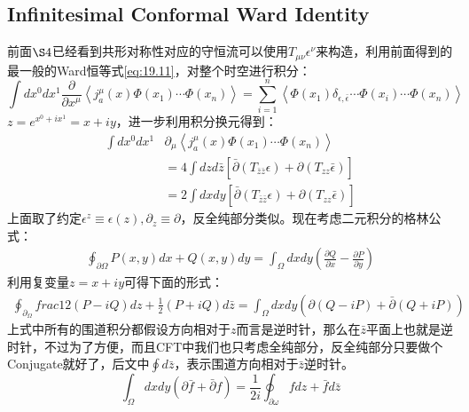 \subsection{Infinitesimal Conformal Ward Identity}
前面$\S 4$已经看到共形对称性对应的守恒流可以使用$T_{\mu\nu}\epsilon^\nu$来构造，利用前面得到的最一般的Ward恒等式\ref{eq:19.11}，对整个时空进行积分：
\begin{equation}
	\int dx^0dx^1\frac\partial{\partial x^{\mu}} \left\langle j_{a}^{\mu}(x)\Phi(x_{1})\cdots\Phi(x_{n})\right\rangle  =\sum_{i=1}^{n}\left<\Phi(x_{1})\delta_{\epsilon,\bar \epsilon}\cdots\Phi(x_{i})\cdots\Phi(x_{n})\right>
\end{equation}
$z=e^{x^0+ix^1}=x+iy$，进一步利用积分换元得到：
\begin{equation}
	\begin{aligned}
		\int dx^0dx^1&\partial_\mu\left\langle j_{a}^{\mu}(x)\Phi(x_{1})\cdots\Phi(x_{n})\right\rangle\\
		&=4\int dzd\bar z\left[\bar\partial(T_{\bar z\bar z}\epsilon)+\partial(T_{zz}\bar\epsilon)\right]\\
		&=2\int dxdy\left[\bar\partial(T_{\bar z\bar z}\epsilon)+\partial(T_{zz}\bar\epsilon)\right]
	\end{aligned}
\end{equation}
上面取了约定$\epsilon^z\equiv\epsilon(z),\partial_z\equiv\partial$，反全纯部分类似。现在考虑二元积分的格林公式：
\begin{equation}
	\begin{aligned}\oint_{\partial\Omega}P(x,y)dx+Q(x,y)dy=\int_\Omega dxdy\left(\frac{\partial Q}{\partial x}-\frac{\partial P}{\partial y}\right)\end{aligned}
\end{equation}
利用复变量$z=x+iy$可得下面的形式：
\begin{equation}
	\begin{aligned}\oint_{\partial_\Omega}frac{1}{2}(P-iQ)dz+\frac{1}{2}(P+iQ)d\bar{z}=\int_\Omega dxdy(\partial(Q-iP)+\bar{\partial}(Q+iP))\end{aligned}
\end{equation}
上式中所有的围道积分都假设方向相对于$z$而言是逆时针，那么在$\bar z$平面上也就是逆时针，不过为了方便，而且CFT中我们也只考虑全纯部分，反全纯部分只要做个Conjugate就好了，后文中$\oint d\bar z$，表示围道方向相对于$\bar z$逆时针。
\begin{equation}
	\int_\Omega dxdy\left(\partial \bar f+\bar\partial f\right)=\frac{1}{2i}\oint_{\partial\omega}fdz+\bar f d\bar z
\end{equation}
